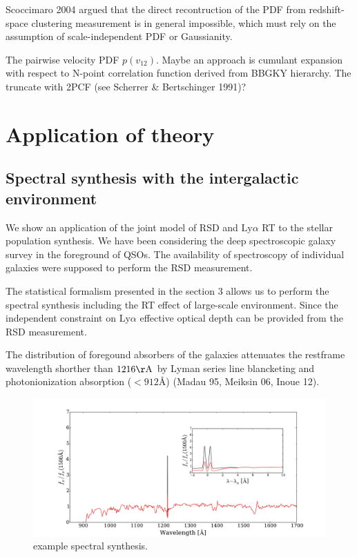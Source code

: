 \documentclass[useAMS,usenatbib,twocolumn]{mn2e}
\newcommand{\LyA}{\mbox{Ly}\alpha}
\begin{document}
Scoccimaro 2004 argued that the direct recontruction of the PDF from 
redshift-space clustering measurement is in general impossible, which
must rely on the assumption of scale-independent PDF or Gaussianity.


The pairwise velocity PDF $p(v_{12})$. Maybe an approach is cumulant
expansion with respect to N-point correlation function derived from 
BBGKY hierarchy. The truncate with 2PCF (see Scherrer \& Bertschinger 1991)? 


\section{Application of theory}
\subsection{Spectral synthesis with the intergalactic environment}

We show an application of the joint model of RSD and $\LyA$ RT to
the stellar population synthesis. 
We have been considering the deep spectroscopic galaxy survey in the 
foreground of QSOs. The availability of spectroscopy of individual 
galaxies were supposed to perform the RSD measurement. 

The statistical formalism presented in the section 3 allows us to perform
the spectral synthesis including the RT effect of large-scale environment.
Since the independent constraint on $\LyA$ effective optical depth can
be provided from the RSD measurement. 

The distribution of foregound absorbers of the galaxies attenuates
the restframe wavelength shorther than $1216\rm{\AA}$ by Lyman series 
line blancketing and photonionization absorption ($<912$\AA)
(Madau 95, Meiksin 06, Inoue 12). 

\begin{figure}
 \begin{center}
  \includegraphics[angle=0,width=\textwidth]{figure/spectral_synthesis.pdf}
  \caption{example spectral synthesis.}
 \end{center}
\end{figure}
\end{document}
